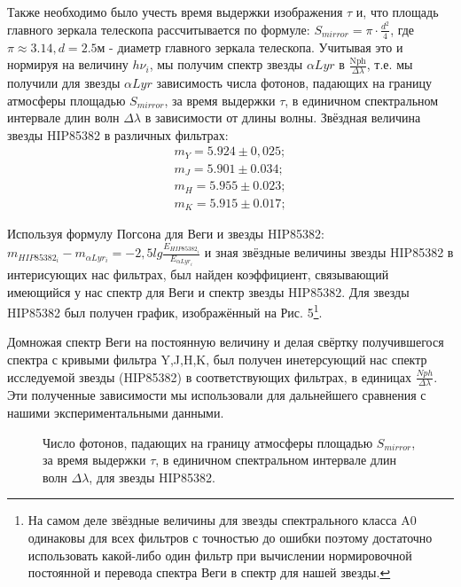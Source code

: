 \documentclass[a4paper]{article}
\begin{document}
Также необходимо было учесть время выдержки изображения $\tau$ и, что площадь главного зеркала телескопа рассчитывается по формуле: $S_{mirror} = \pi\cdot\frac{d^2}{4}$, где $\pi\approx 3.14, d = 2.5 \text{м}$ - диаметр главного зеркала телескопа. Учитывая это и нормируя на величину $h\nu_i$, мы получим спектр звезды $\alpha Lyr$ в $\frac{\text{Nph}}{\Delta\lambda}$, т.е. мы получили для звезды $\alpha Lyr$ зависимость числа фотонов, падающих на границу атмосферы площадью $S_{mirror}$, за время выдержки $\tau$, в единичном спектральном интервале длин волн $\Delta\lambda$ в зависимости от длины волны. Звёздная величина звезды HIP85382 в различных фильтрах:
\begin{eqnarray*}
m_Y = 5.924\pm 0,025; \\
m_J = 5.901\pm 0.034; \\
m_H = 5.955\pm 0.023; \\
m_K = 5.915\pm 0.017;
\end{eqnarray*}

Используя формулу Погсона для Веги и звезды HIP85382: $m_{HIP85382_i} - m_{\alpha Lyr_i}= -2,5lg{\frac{E_{HIP85382_i}}{E_{\alpha Lyr_i}}}$ и зная звёздные величины звезды HIP85382 в интерисующих нас фильтрах, был найден коэффициент, связывающий имеющийся у нас спектр для Веги и спектр звезды HIP85382. Для звезды HIP85382 был получен график, изображённый на Рис. 5\footnote{На самом деле звёздные величины для звезды спектрального класса A0 одинаковы для всех фильтров с точностью до ошибки поэтому достаточно использовать какой-либо один фильтр при вычислении нормировочной постоянной и перевода спектра Веги в спектр для нашей звезды.}.

Домножая спектр Веги на постоянную величину и делая свёртку получившегося спектра с кривыми фильтра Y,J,H,K, был получен инетерсующий нас спектр исследуемой звезды  (HIP85382) в соответствующих фильтрах, в единицах $\frac{Nph}{\Delta\lambda}$. Эти полученные зависимости мы использовали для дальнейшего сравнения с нашими экспериментальными данными.
\begin{figure}[h]
\caption{Число фотонов, падающих на границу атмосферы площадью $S_{mirror}$, за время выдержки $\tau$, в единичном спектральном интервале длин волн $\Delta\lambda$, для звезды HIP85382.}
\label{ris:image}
\end{figure}
\end{document}
